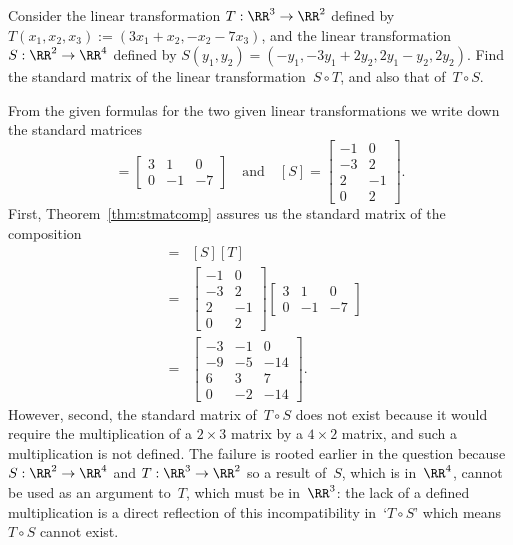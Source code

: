 \begin{example} \label{eg:}
Consider the linear transformation \(T:\RR^3\to\RR^2\) defined by \(T(x_1,x_2,x_3):=(3x_1+x_2,-x_2-7x_3)\), and the linear transformation \(S:\RR^2\to\RR^4\) defined by \(S(y_1,y_2)=(-y_1, -3y_1+2y_2, 2y_1-y_2, 2y_2)\).
Find the standard matrix of the linear transformation~\(S\circ T\), and also that of~\(T\circ S\).
\begin{solution} 
From the given formulas for the two given linear transformations we write down the standard matrices
\begin{equation*}
[T]=\begin{bmatrix}3&1&0\\0&-1&-7  \end{bmatrix}
\quad\text{and}\quad
[S]=\begin{bmatrix} -1&0\\ -3&2\\2&-1\\0&2 \end{bmatrix}.
\end{equation*}
First, Theorem~\ref{thm:stmatcomp} assures us the standard matrix of the composition
\begin{eqnarray*}
[S\circ T]&=&[S][T]
\\&=&\begin{bmatrix} -1&0\\ -3&2\\2&-1\\0&2 \end{bmatrix}
\begin{bmatrix}3&1&0\\0&-1&-7  \end{bmatrix}
\\&=&\begin{bmatrix}-3&-1&0
\\-9&-5&-14
\\6&3&7
\\0&-2&-14 \end{bmatrix}.
\end{eqnarray*}
However, second, the standard matrix of~\(T\circ S\) does not exist because it would require the multiplication of a \(2\times3\) matrix by a \(4\times 2\) matrix, and such a multiplication is not defined.
The failure is rooted earlier in the question because \(S:\RR^2\to\RR^4\) and \(T:\RR^3\to\RR^2\) so a result of~\(S\), which is in~\(\RR^4\), cannot be used as an argument to~\(T\), which must be in~\(\RR^3\): the lack of a defined multiplication is a direct reflection of this incompatibility in~`\(T\circ S\)' which means \(T\circ S\) cannot exist.
\end{solution}
\end{example}



